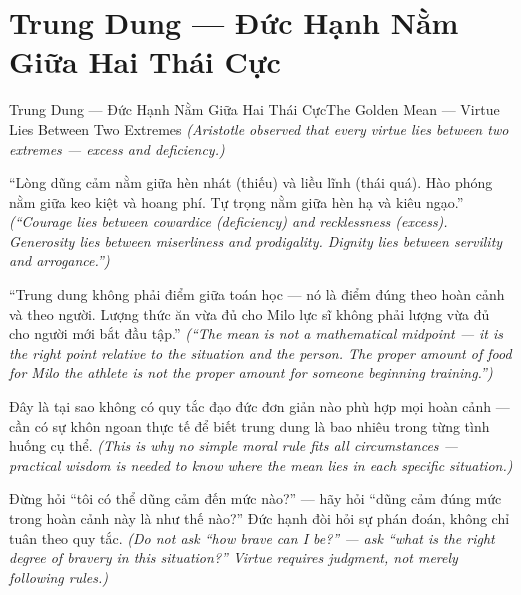 \section{Trung Dung — Đức Hạnh Nằm Giữa Hai Thái Cực}
\begin{truyen}{Trung Dung — Đức Hạnh Nằm Giữa Hai Thái Cực}{The Golden Mean — Virtue Lies Between Two Extremes}
\textit{(Aristotle observed that every virtue lies between two extremes — excess and deficiency.)}

``Lòng dũng cảm nằm giữa hèn nhát (thiếu) và liều lĩnh (thái quá). Hào phóng nằm giữa keo kiệt và hoang phí. Tự trọng nằm giữa hèn hạ và kiêu ngạo.''
\textit{(``Courage lies between cowardice (deficiency) and recklessness (excess). Generosity lies between miserliness and prodigality. Dignity lies between servility and arrogance.'')}

``Trung dung không phải điểm giữa toán học — nó là điểm đúng theo hoàn cảnh và theo người. Lượng thức ăn vừa đủ cho Milo lực sĩ không phải lượng vừa đủ cho người mới bắt đầu tập.''
\textit{(``The mean is not a mathematical midpoint — it is the right point relative to the situation and the person. The proper amount of food for Milo the athlete is not the proper amount for someone beginning training.'')}

Đây là tại sao không có quy tắc đạo đức đơn giản nào phù hợp mọi hoàn cảnh — cần có sự khôn ngoan thực tế để biết trung dung là bao nhiêu trong từng tình huống cụ thể.
\textit{(This is why no simple moral rule fits all circumstances — practical wisdom is needed to know where the mean lies in each specific situation.)}

\end{truyen}

\begin{baihoc}
Đừng hỏi ``tôi có thể dũng cảm đến mức nào?'' — hãy hỏi ``dũng cảm đúng mức trong hoàn cảnh này là như thế nào?'' Đức hạnh đòi hỏi sự phán đoán, không chỉ tuân theo quy tắc.
\textit{(Do not ask ``how brave can I be?'' — ask ``what is the right degree of bravery in this situation?'' Virtue requires judgment, not merely following rules.)}
\end{baihoc}
\ngancach

